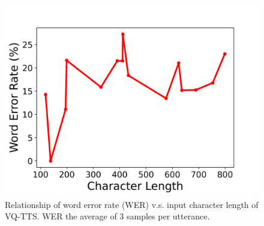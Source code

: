 \begin{figure}[!htb]
    \centering
    \includegraphics[width=\columnwidth]{imgs/robust.png}
    \caption{Relationship of word error rate (WER) v.s. input character length of VQ-TTS. WER the average of 3 samples per utterance.}
    \label{fig:robust}
\end{figure}